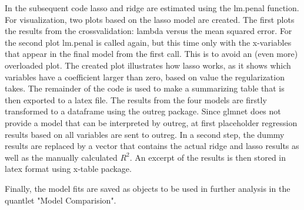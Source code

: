 In the subsequent code lasso and ridge are estimated using the lm.penal function.  For visualization, two plots based on the lasso model are created. The first plots the results from the crossvalidation: lambda versus the mean squared error. For the second plot lm.penal is called again, but this time only with the x-variables that appear in the final model from the first call. This is to avoid an (even more) overloaded plot. The created plot illustrates how lasso works, as it shows which variables have a coefficient larger than zero, based on value  the regularization takes. 
The remainder of the code is used to make a summarizing table that is then exported to  a latex file. The results from the four models are firstly transformed to a dataframe using the outreg package. Since glmnet does not provide  a model that can be interpreted by outreg, at first placeholder regression results based on all variables are sent to outreg. In a second step, the dummy results are replaced by a vector that contains the actual ridge and lasso results as well as the manually calculated $R^{2}$.  An excerpt of the results is then stored in latex format using x-table package. 

Finally, the model fits are saved as objects to be used in further analysis in the quantlet "Model Comparision". 


